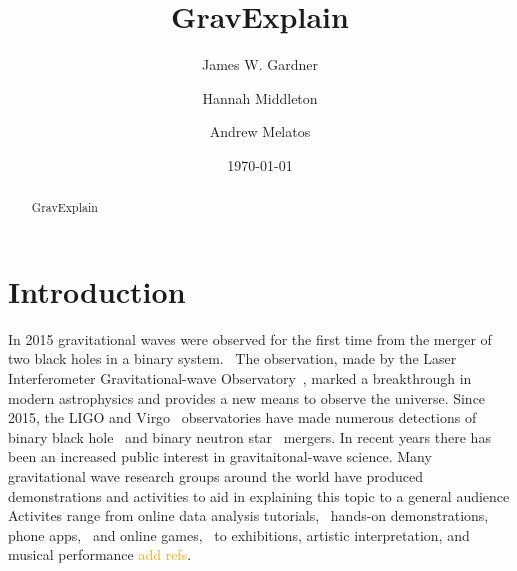 \documentclass[prb,preprint]{revtex4-1}
\newcommand{\han}{\textcolor{orange}}
\begin{document}
\title{GravExplain}

\author{James W. Gardner}

\author{Hannah Middleton}
\author{Andrew Melatos}

\date{\today}

\begin{abstract}
GravExplain

\end{abstract}

\maketitle

\section{Introduction}

In 2015 gravitational waves were observed for the first time from the merger of two black holes in a binary system.~\cite{GW150914} 
The observation, made by the Laser Interferometer Gravitational-wave Observatory~\citep[LIGO]{AdvancedLIGO:2015}, marked a breakthrough in modern astrophysics and provides a new means to observe the universe. 
Since 2015, the LIGO and Virgo~\cite{AdvancedVirgo:2015} observatories have made numerous detections of binary black hole~\cite{GW151226,GW170104,GW170814} and binary neutron star~\cite{GW170817,GW170817multi,GW190425} mergers. 
In recent years there has been an increased public interest in gravitaitonal-wave science. 
Many gravitational wave research groups around the world have produced demonstrations and activities to aid in explaining this topic to a general audience
Activites range from online data analysis tutorials,~\cite{GWOSC:online,LOSC:2015} hands-on demonstrations, phone apps,~\cite{LaserLabs:online,SciVR:online} and online games,~\cite{BlackHoleHunter:online} to exhibitions,\cite{L2URSSE} artistic interpretation, and musical performance \han{add refs}. 
\end{document}
